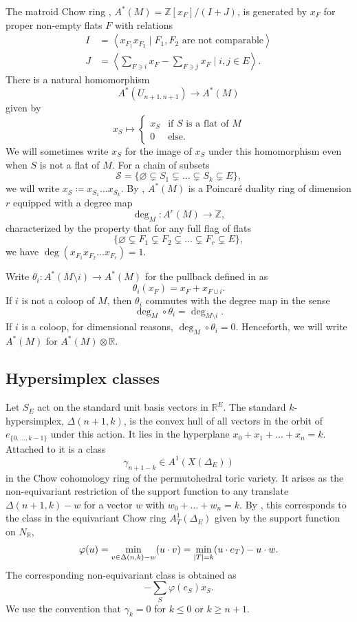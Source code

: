 \documentclass[ALCO,published]{cedram}
\numberwithin{equation}{section}
\numberwithin{figure}{section}
\newcommand{\R}{\mathbb{R}}
\newcommand{\RR}{\mathbb{R}}
\newcommand{\Z}{\mathbb{Z}}
\begin{document}
The matroid Chow ring \cite{FY:chow}, $A^*(M)=\Z[x_F]/(I+J)$, is generated by $x_F$ for proper non-empty flats $F$ with relations
\begin{align*}
I&=\left\langle x_{F_1}x_{F_2}\mid F_1,F_2 \text{ are not comparable}\right\rangle\\
J&=\left\langle \sum_{F\ni i} x_F- \sum_{F\ni j} x_F\mid i,j\in E\right\rangle.
\end{align*}
There is a natural homomorphism 
\[A^*(U_{n+1,n+1})\to A^*(M)\]
given by
\[x_S\mapsto 
\begin{cases}
x_S &\text{if $S$ is a flat of $M$}\\
0 &\text{else}.
\end{cases}\]
We will sometimes write $x_S$ for the image of $x_S$ under this homomorphism even when $S$ is not a flat of $M$. For a chain of subsets 
\[\mathcal{S}=\{\varnothing\subsetneq S_1\subsetneq\dots\subsetneq S_k\subsetneq E\},\]
we will write $x_{\mathcal{S}}\coloneqq x_{S_1}\dots x_{S_k}$.
By \cite{AHK}, $A^*(M)$ is a Poincar\'{e} duality ring of dimension $r$ equipped with a degree map
\[\deg_M\colon A^r(M)\to \Z,\]
characterized by the property that for any full flag of flats
\[\{\varnothing \subsetneq F_1\subsetneq F_2\subsetneq \dots\subsetneq F_r\subsetneq E\},\]
we have $\deg(x_{F_1}x_{F_2}\dots x_{F_r})=1.$

Write $\theta_i\colon A^*(M\setminus i)\to A^*(M)$ for the pullback defined in \cite[Section~3]{BHMPW:semismall} as
\[\theta_i(x_F)=x_F+x_{F\cup i}.\]
If $i$ is not a coloop of $M$, then $\theta_i$ commutes with the degree map in the sense
\[\deg_M\circ \theta_i=\deg_{M\setminus i}.\]
If $i$ is a coloop, for dimensional reasons, $\deg_M\circ\theta_i=0$. Henceforth, we will write $A^*(M)$ for $A^*(M)\otimes\R$.


\subsection{Hypersimplex classes}

Let $S_{E}$ act on the standard unit basis vectors in $\RR^{E}$. The standard $k$-hypersimplex, $\Delta(n+1,k)$, is the convex hull of all vectors in the orbit of $e_{\{0,\dots,k-1\}}$ under this action. It lies in the hyperplane $x_0+x_1+\dots+x_n=k$. 
Attached to it is a class 
\[\gamma_{n+1-k}\in A^1(X(\Delta_{E}))\]
in the Chow cohomology ring of the permutohedral toric variety. It arises as the non-equivariant restriction of the support function to any translate $\Delta(n+1,k)-w$ for a vector $w$ with $w_0+\dots+w_n=k$. By \cite[Section~6.1]{CoxLittleSchenck}, this corresponds to the class in the equivariant Chow ring $A_T^1(\Delta_{E})$ given by the support function on $N_{\R}$,
\[\varphi(u)=\min_{v\in \Delta(n,k)-w}(u\cdot v)\\
=\min_{|T|=k}(u\cdot e_T)-u\cdot w.
\]
The corresponding non-equivariant class is obtained as
\[-\sum_S \varphi(e_S)x_S.\]
We use the convention that $\gamma_k=0$ for $k\leq 0$ or $k\geq n+1$.
\end{document}
